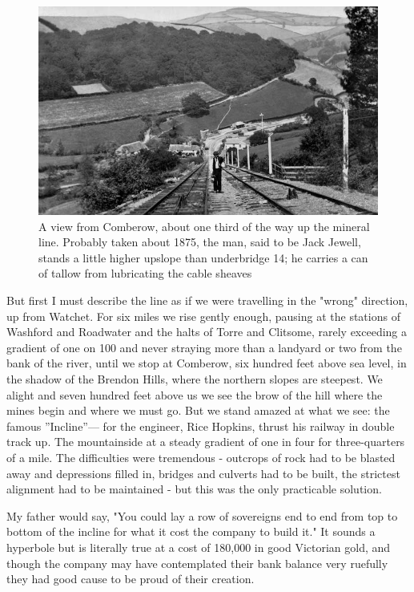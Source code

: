 \begin{figure}
	 \centering
     \includegraphics[width=1\textwidth]{figures/inclineTop}
     \caption{A view from Comberow, about one third of the way up the mineral line. Probably taken about 1875, the man, said to be Jack Jewell, stands a little higher upslope than underbridge 14; he carries a can of tallow from lubricating the cable sheaves}
     \label{fig:inclineTop}
\end{figure}

But first I must describe the line as if we were travelling in the "wrong" direction, up from Watchet. For six miles we rise gently enough, pausing at the stations of Washford and Roadwater and the halts of Torre and Clitsome, rarely exceeding a gradient of one on 100 and never straying more than a landyard or two from the bank of the river, until we stop at Comberow, six hundred feet above sea level, in the shadow of the Brendon Hills, where the northern slopes are steepest. We alight and seven hundred feet above us we see the brow of the hill where the mines begin and where we must go. But we stand amazed at what we see: the famous ''Incline”— for the engineer, Rice Hopkins, thrust his railway in double track up. The mountainside at a steady gradient of one in four for three-quarters of a mile. The difficulties were tremendous - outcrops of rock had to be blasted away and depressions filled in, bridges and culverts had to be built, the strictest alignment had to be maintained - but this was the only practicable solution.




My father would say, "You could lay a row of sovereigns end to end from top to bottom of the incline for what it cost the company to build it." It sounds a hyperbole but is literally true at a cost of 180,000 in good Victorian gold, and though the company may have contemplated their bank balance very ruefully they had good cause to be proud of their creation.


